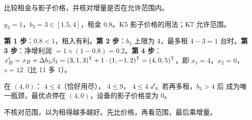 比较租金与影子价格，并核对增量是否在允许范围内。\par
{}$y_3=1$，$b_3=3\in[1.5,4]$，租金 0.8。\quad{}K5 影子价格的用法；K7 允许范围。\par
{}\textbf{第 1 步}：$0.8<1$，租入有利。\textbf{第 2 步}：$b_3$ 上限为 4，最多租 $4-3=1$ 台时。\textbf{第 3 步}：净增利润 $=1\times(1-0.8)=0.2$。\textbf{第 4 步}：$x_B'=x_B+\Delta b_3\beta_3=(3,1,3)^{\mathsf T}+1\cdot(1,-1,2)^{\mathsf T}=(4,0,5)^{\mathsf T}$，即 $x_1=4$，$x_2=0$，$z=12$（比 11 多 1）。
\begin{figure}[!htbp]\centering
{}
\end{figure}
在 $(4,0)$： $4\le4$（恰好用尽）， $4\le9$， $4\le4$ ✓。若再多租，$b_3>4$ 后  成为唯一瓶颈，最优点停在 $(4,0)$，设备的影子价格变为 0。\par
{}不核对范围，以为租得越多越好。\quad{}先比价格，再看范围，最后乘增量。

